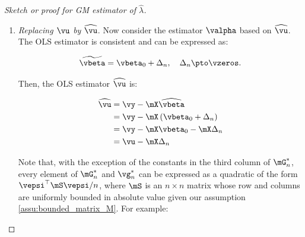 \documentclass[english,12pt]{book}\usepackage[]{graphicx}\usepackage[]{xcolor}
\begin{document}
\begin{proof}[Sketch or proof for GM estimator of $\widehat{\lambda}$]
\begin{enumerate}
Also:

\begin{equation*}
\begin{aligned}
\plim \vg_n^* &= \plim \mG^*\valpha \\
 & = \mGamma\valpha
 \end{aligned}
\end{equation*}

If $\vu$ would be observed,  a linear GMM estimator for $\lambda$, say $\widetilde{\lambda}$,  would be the first element of the least squared estimator $\valpha$, namely:

\begin{equation*}
  \widetilde{\valpha}= \mG_n^{-1*}\vg_n^*
\end{equation*}
%
since $\mG_n^{*}$ is a $3\times 3$ matrix which is nonsingular. Thus, using our previous results:

\begin{equation}\label{eq:consisten_error_gm}
  \plim \widetilde{\valpha}=\plim \mG_n^{-1*} \plim \vg_n^* = \mGamma_n^{-1}\vgamma_n = \valpha
\end{equation}

\item \emph{Replacing $\vu$ by $\widehat{\vu}$}. Now consider the estimator $\valpha$ based on $\widehat{\vu}$. The OLS estimator is consistent and can be expressed as:

\begin{equation*}
\widetilde{\vbeta} = \vbeta_0 + \Delta_n, \quad \Delta_n\pto \vzeros.
\end{equation*}

Then, the OLS estimator $\widehat{\vu}$ is:

\begin{equation*}
\begin{aligned}
\widehat{\vu} & = \vy - \mX\widehat{\vbeta}  \\
              & = \vy - \mX\left(\vbeta_0 + \Delta_n\right) \\
              & = \vy - \mX\vbeta_0 - \mX\Delta_n \\
              & = \vu - \mX\Delta_n 
\end{aligned}
\end{equation*}

Note that, with the exception of the constants in the third column of $\mG^*_n$, every element of $\mG^*_n$ and $\vg_n^*$ can be expressed as a quadratic of the form $\vepsi^\top\mS\vepsi/n$, where $\mS$ is an $n\times n$ matrix whose row and columns are uniformly bounded in absolute value given our assumption \ref{assu:bounded_matrix_M}. For example:


\end{enumerate}
\end{proof}
\end{document}
